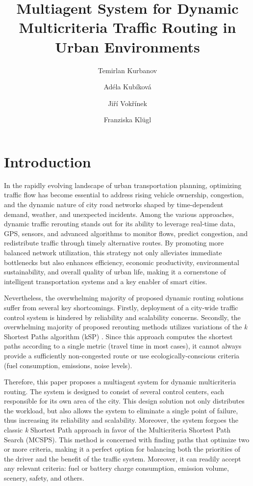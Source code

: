 \documentclass[sigconf]{aamas}
\title[Multiagent Dynamic Multicriteria Traffic Routing]{Multiagent System for Dynamic Multicriteria Traffic Routing in Urban Environments}
\author{Temirlan Kurbanov}
\affiliation{
  \institution{Department of Computer Science, FEE CTU}
  \city{Prague}
  \country{Czechia}}
\author{Adéla Kubíková}
\affiliation{
  \institution{Department of Computer Science, FEE CTU}
  \city{Prague}
  \country{Czechia}}
\author{Jiří Vokřínek}
\affiliation{
  \institution{Department of Computer Science, FEE CTU}
  \city{Prague}
  \country{Czechia}}
\author{Franziska Klügl}
\affiliation{
  \institution{School of Science and Technology, Örebro University}
  \city{Örebro}
  \country{Sweden}}
\begin{document}

\pagestyle{fancy}
\fancyhead{}


\maketitle 




\section{Introduction}
In the rapidly evolving landscape of urban transportation planning, optimizing traffic flow has become essential to address rising vehicle ownership, congestion, and the dynamic nature of city road networks shaped by time-dependent demand, weather, and unexpected incidents. Among the various approaches, dynamic traffic rerouting stands out for its ability to leverage real-time data, GPS, sensors, and advanced algorithms to monitor flows, predict congestion, and redistribute traffic through timely alternative routes. By promoting more balanced network utilization, this strategy not only alleviates immediate bottlenecks but also enhances efficiency, economic productivity, environmental sustainability, and overall quality of urban life, making it a cornerstone of intelligent transportation systems and a key enabler of smart cities.

Nevertheless, the overwhelming majority of proposed dynamic routing solutions suffer from several key shortcomings. Firstly, deployment of a city-wide traffic control system is hindered by reliability and scalability concerns. Secondly, the overwhelming majority of proposed rerouting methods utilizes variations of the \textit{k} Shortest Paths algorithm (kSP) \cite{kSP}. Since this approach computes the shortest paths according to a single metric (travel time in most cases), it cannot always provide a sufficiently non-congested route or use ecologically-conscious criteria (fuel consumption, emissions, noise levels).

Therefore, this paper proposes a multiagent system for dynamic multicriteria routing. The system is designed to consist of several control centers, each responsible for its own area of the city. This design solution not only distributes the workload, but also allows the system to eliminate a single point of failure, thus increasing its reliability and scalability. Moreover, the system forgoes the classic \textit{k} Shortest Path approach in favor of the Multicriteria Shortest Path Search (MCSPS). This method is concerned with finding paths that optimize two or more criteria, making it a perfect option for balancing both the priorities of the driver and the benefit of the traffic system. Moreover, it can readily accept any relevant criteria: fuel or battery charge consumption, emission volume, scenery, safety, and others.
\end{document}
